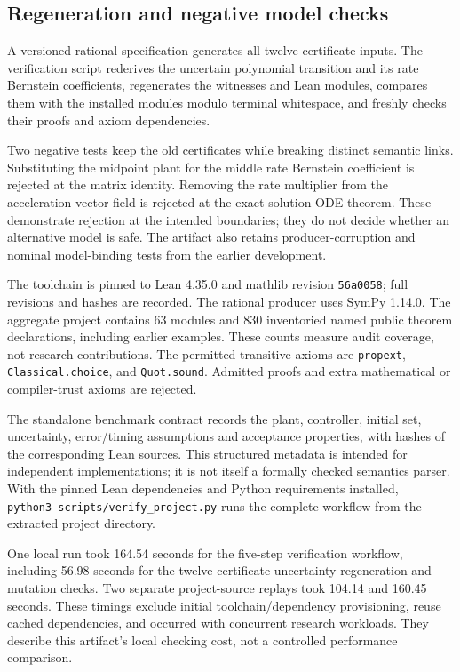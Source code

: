 \documentclass[10pt]{article}
\newcommand{\code}[1]{\texttt{#1}}
\begin{document}
\subsection{Regeneration and negative model checks}
A versioned rational specification generates all twelve certificate inputs. The verification script rederives the uncertain polynomial transition and its rate Bernstein coefficients, regenerates the witnesses and Lean modules, compares them with the installed modules modulo terminal whitespace, and freshly checks their proofs and axiom dependencies.

Two negative tests keep the old certificates while breaking distinct semantic links. Substituting the midpoint plant for the middle rate Bernstein coefficient is rejected at the matrix identity. Removing the rate multiplier from the acceleration vector field is rejected at the exact-solution ODE theorem. These demonstrate rejection at the intended boundaries; they do not decide whether an alternative model is safe. The artifact also retains producer-corruption and nominal model-binding tests from the earlier development.

The toolchain is pinned to Lean 4.35.0 and mathlib revision \code{56a0058}; full revisions and hashes are recorded. The rational producer uses SymPy 1.14.0. The aggregate project contains 63 modules and 830 inventoried named public theorem declarations, including earlier examples. These counts measure audit coverage, not research contributions. The permitted transitive axioms are \code{propext}, \code{Classical.choice}, and \code{Quot.sound}. Admitted proofs and extra mathematical or compiler-trust axioms are rejected.

The standalone benchmark contract  records the plant, controller, initial set, uncertainty, error/timing assumptions and acceptance properties, with hashes of the corresponding Lean sources. This structured metadata is intended for independent implementations; it is not itself a formally checked semantics parser. With the pinned Lean dependencies and Python requirements installed, \texttt{python3\ scripts/verify\_project.py} runs the complete workflow from the extracted project directory.

One local run took 164.54 seconds for the five-step verification workflow, including 56.98 seconds for the twelve-certificate uncertainty regeneration and mutation checks. Two separate project-source replays took 104.14 and 160.45 seconds. These timings exclude initial toolchain/dependency provisioning, reuse cached dependencies, and occurred with concurrent research workloads. They describe this artifact's local checking cost, not a controlled performance comparison.
\end{document}
